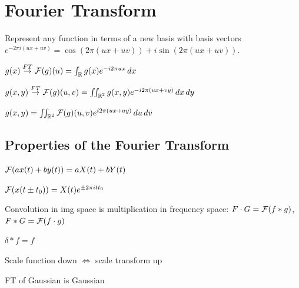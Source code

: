 \section{Fourier Transform}
Represent any function in terms of a new basis with basis vectors \(e^{-2\pi i(ux + uv)} = \cos(2\pi(ux + uv)) + i \sin(2\pi(ux + uv))\).

\begin{definition}[1D-FT]
  \(g(x) \overset{FT}{\to} \operatorname{\mathcal{F}}(g)(u) = \int_{\operatorname{\mathbb{R}}} g(x) e^{-i2\pi ux} \, dx\)
\end{definition}

\begin{definition}[2D-FT]
  \(g(x, y) \overset{FT}{\to} \operatorname{\mathcal{F}}(g)(u, v) = \iint_{\operatorname{\mathbb{R}}^2} g(x, y) e^{-i2\pi (ux + vy)} \,dx \,dy\)
\end{definition}

\begin{definition}[Inverse FT]
  \(g(x, y) = \iint_{\operatorname{\mathbb{R}}^2} \operatorname{\mathcal{F}}(g)(u, v) e^{i2\pi(ux + uy)} \,du \,dv\)
\end{definition}

\subsection{Properties of the Fourier Transform}

\begin{definition}[Linearity]
  \(\operatorname{\mathcal{F}}(ax(t) + by(t)) = a X(t) + b Y(t)\)
\end{definition}

\begin{definition}
  \(\operatorname{\mathcal{F}}(x(t \pm t_0)) = X(t)e^{\pm 2 \pi i t t_0}\)
\end{definition}

\begin{algorithm}
  Convolution in img space is multiplication in frequency space: \(F \cdot G = \operatorname{\mathcal{F}}(f \ast g)\), \(F \ast G = \operatorname{\mathcal{F}}(f \cdot g)\)
\end{algorithm}

\begin{definition}
  \(\delta \ast f = f\)
\end{definition}

\begin{definition}
  Scale function down \(\iff\) scale transform up
\end{definition}

\begin{definition}[Gaussian]
  FT of Gaussian is Gaussian
\end{definition}


